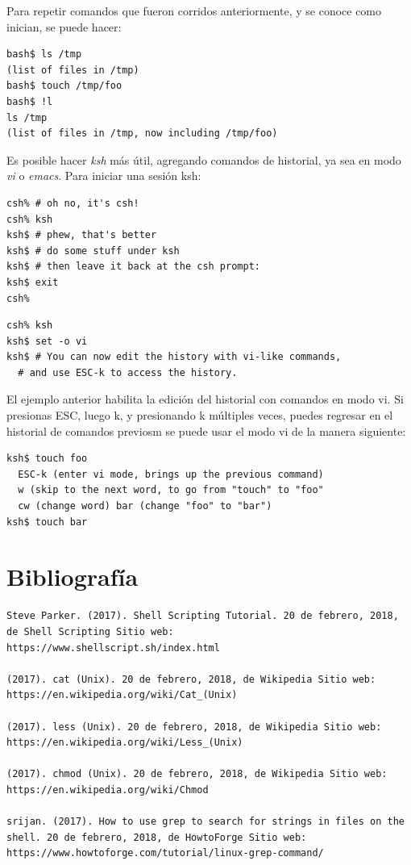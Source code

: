\documentclass[a4paper]{article}
\begin{document}
Para repetir comandos que fueron corridos anteriormente, y se conoce como inician, se puede hacer:

\begin{verbatim}
bash$ ls /tmp
(list of files in /tmp)
bash$ touch /tmp/foo
bash$ !l
ls /tmp
(list of files in /tmp, now including /tmp/foo)
\end{verbatim}

Es posible hacer \textit{ksh} más útil, agregando comandos de historial, ya sea en modo \textit{vi} o \textit{emacs}. Para iniciar una sesión ksh:

\begin{verbatim}
csh% # oh no, it's csh!
csh% ksh
ksh$ # phew, that's better
ksh$ # do some stuff under ksh
ksh$ # then leave it back at the csh prompt:
ksh$ exit
csh%
\end{verbatim}

\begin{verbatim}
csh% ksh
ksh$ set -o vi
ksh$ # You can now edit the history with vi-like commands, 
  # and use ESC-k to access the history.
\end{verbatim}

El ejemplo anterior habilita la edición del historial con comandos en modo vi. Si presionas ESC, luego k, y presionando k múltiples veces, puedes regresar en el historial de comandos previosm se puede usar el modo vi de la manera siguiente:

\begin{verbatim}
ksh$ touch foo
  ESC-k (enter vi mode, brings up the previous command)
  w (skip to the next word, to go from "touch" to "foo"
  cw (change word) bar (change "foo" to "bar")
ksh$ touch bar
\end{verbatim}

\section*{Bibliografía}

\begin{verbatim}
Steve Parker. (2017). Shell Scripting Tutorial. 20 de febrero, 2018, de Shell Scripting Sitio web: 
https://www.shellscript.sh/index.html

(2017). cat (Unix). 20 de febrero, 2018, de Wikipedia Sitio web: 
https://en.wikipedia.org/wiki/Cat_(Unix)

(2017). less (Unix). 20 de febrero, 2018, de Wikipedia Sitio web: 
https://en.wikipedia.org/wiki/Less_(Unix)

(2017). chmod (Unix). 20 de febrero, 2018, de Wikipedia Sitio web: https://en.wikipedia.org/wiki/Chmod

srijan. (2017). How to use grep to search for strings in files on the shell. 20 de febrero, 2018, de HowtoForge Sitio web: https://www.howtoforge.com/tutorial/linux-grep-command/
\end{verbatim}
\end{document}
